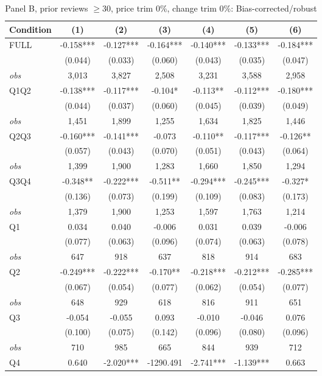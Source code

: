 \documentclass[11pt]{article}
\begin{document}
\begin{table}[!htbp]
\centering
\caption{Panel B, prior reviews $\geq 30$, price trim 0\%, change trim 0\%: Bias-corrected/robust}
\label{tab:b:trim00:reviews30:robust}
\small
\begin{tabular}{lcccccc}
\toprule
Condition & (1) & (2) & (3) & (4) & (5) & (6) \\
\midrule
FULL & -0.158*** & -0.127*** & -0.164*** & -0.140*** & -0.133*** & -0.184*** \\
 & (0.044) & (0.033) & (0.060) & (0.043) & (0.035) & (0.047) \\
\textit{obs} & 3,013 & 3,827 & 2,508 & 3,231 & 3,588 & 2,958 \\
Q1Q2 & -0.138*** & -0.117*** & -0.104* & -0.113** & -0.112*** & -0.180*** \\
 & (0.044) & (0.037) & (0.060) & (0.045) & (0.039) & (0.049) \\
\textit{obs} & 1,451 & 1,899 & 1,255 & 1,634 & 1,825 & 1,446 \\
Q2Q3 & -0.160*** & -0.141*** & -0.073 & -0.110** & -0.117*** & -0.126** \\
 & (0.057) & (0.043) & (0.070) & (0.051) & (0.043) & (0.064) \\
\textit{obs} & 1,399 & 1,900 & 1,283 & 1,660 & 1,850 & 1,294 \\
Q3Q4 & -0.348** & -0.222*** & -0.511** & -0.294*** & -0.245*** & -0.327* \\
 & (0.136) & (0.073) & (0.199) & (0.109) & (0.083) & (0.173) \\
\textit{obs} & 1,379 & 1,900 & 1,253 & 1,597 & 1,763 & 1,214 \\
Q1 & 0.034 & 0.040 & -0.006 & 0.031 & 0.039 & -0.006 \\
 & (0.077) & (0.063) & (0.096) & (0.074) & (0.063) & (0.078) \\
\textit{obs} & 647 & 918 & 637 & 818 & 914 & 683 \\
Q2 & -0.249*** & -0.222*** & -0.170** & -0.218*** & -0.212*** & -0.285*** \\
 & (0.067) & (0.054) & (0.077) & (0.062) & (0.054) & (0.077) \\
\textit{obs} & 648 & 929 & 618 & 816 & 911 & 651 \\
Q3 & -0.054 & -0.055 & 0.093 & -0.010 & -0.046 & 0.076 \\
 & (0.100) & (0.075) & (0.142) & (0.096) & (0.080) & (0.096) \\
\textit{obs} & 710 & 985 & 665 & 844 & 939 & 712 \\
Q4 & 0.640 & -2.020*** & -1290.491 & -2.741*** & -1.139*** & 0.663 \\

\end{tabular}
\end{table}
\end{document}
